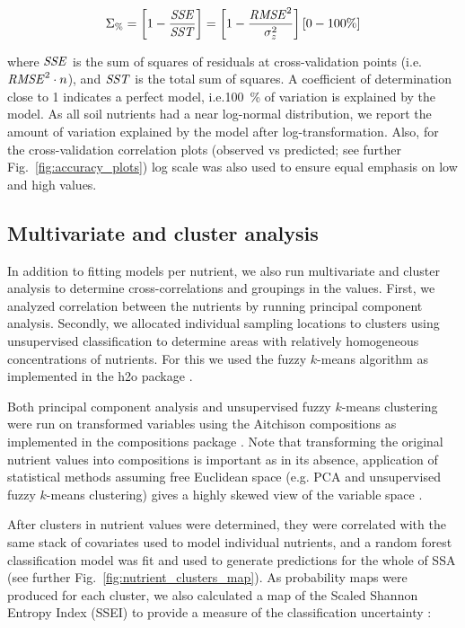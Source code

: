 \begin{linenumbers}
\begin{equation} \label{E:normvar}
 {\Sigma}_{\%} = \left[ 1 - \frac{{\it{SSE}}}{{\it{SST}}} \right] = \left[ 1 - \frac{{\it{RMSE}}^2}{\sigma_z^2} \right] [0-100\%]
\end{equation}

\noindent where $\it{SSE}$ is the sum of squares of residuals at cross-validation points (i.e.\@ ${\it{RMSE}}^2 \cdot n$), and $\it{SST}$ is the total sum of squares. A coefficient of determination close to 1 indicates a perfect model, i.e.\@ \SI{100}{\percent} of variation is explained by the model. As all soil nutrients had a near log-normal distribution, we report the amount of variation explained by the model after log-transformation. Also, for the cross-validation correlation plots (observed vs predicted; see further Fig.\@~\ref{fig:accuracy_plots}) log scale was also used to ensure equal emphasis on low and high values. \par

\subsection{Multivariate and cluster analysis}

In addition to fitting models per nutrient, we also run multivariate and cluster analysis to determine cross-correlations and groupings in the values. First, we analyzed correlation between the nutrients by running principal component analysis. Secondly, we allocated individual sampling locations to clusters using unsupervised classification to determine areas with relatively homogeneous concentrations of nutrients. For this we used the fuzzy $k$-means algorithm as implemented in the \textsf{h2o} package \citep{Spencer2016}.\par 

Both principal component analysis and unsupervised fuzzy $k$-means clustering were run on transformed variables using the Aitchison compositions as implemented in the \textsf{compositions} package \citep{Boogaart2008compositions}. Note that transforming the original nutrient values into compositions is important as in its absence, application of statistical methods assuming free Euclidean space (e.g. PCA and unsupervised fuzzy $k$-means clustering) gives a highly skewed view of the variable space \citep{Boogaart2008compositions}. \par

After clusters in nutrient values were determined, they were correlated with the same stack of covariates used to model individual nutrients, and a random forest classification model was fit and used to generate predictions for the whole of SSA (see further Fig.\@~\ref{fig:nutrient_clusters_map}). As probability maps were produced for each cluster, we also calculated a map of the Scaled Shannon Entropy Index (SSEI) to provide a measure of the classification uncertainty \citep{shannon1949communication,borda2011fundamentals}:


\end{linenumbers}
